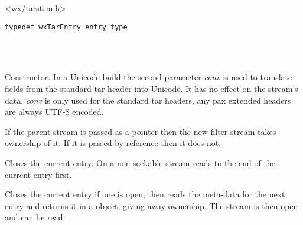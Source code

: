 


<wx/tarstrm.h>



\begin{verbatim}
typedef wxTarEntry entry_type
\end{verbatim}

\\
\\



\label{wxtarinputstreamwxtarinputstream}



Constructor. In a Unicode build the second parameter {\it conv} is
used to translate fields from the standard tar header into Unicode. It has
no effect on the stream's data. {\it conv} is only used for the standard
tar headers, any pax extended headers are always UTF-8 encoded.

If the parent stream is passed as a pointer then the new filter stream
takes ownership of it. If it is passed by reference then it does not.


\label{wxtarinputstreamcloseentry}


Closes the current entry. On a non-seekable stream reads to the end of
the current entry first.


\label{wxtarinputstreamgetnextentry}


Closes the current entry if one is open, then reads the meta-data for
the next entry and returns it in a 
object, giving away ownership. The stream is then open and can be read.


